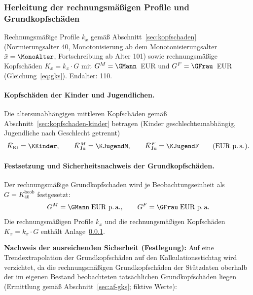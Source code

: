 
\clearpage


\subsubsection{Herleitung der rechnungsmäßigen Profile und Grundkopfschäden}\label{sec:anlage233}

Rechnungsmäßige Profile $k_x$ gemäß Abschnitt~\ref{sec:kopfschaden}
(Normierungsalter 40, Monotonisierung ab dem Monotonisierungsalter
$\tilde{x} = \MonoAlter$, Fortschreibung ab Alter 101) sowie
rechnungsmäßige Kopfschäden $K_x = k_x\cdot G$ mit
$G^{M} = \GMann$~EUR und $G^{F} = \GFrau$~EUR
(Gleichung~\eqref{eq:gks}). Endalter: 110.

\paragraph{Kopfschäden der Kinder und Jugendlichen.}
Die altersunabhängigen mittleren Kopfschäden gemäß
Abschnitt~\ref{sec:kopfschaden-kinder} betragen (Kinder
geschlechtsunabhängig, Jugendliche nach Geschlecht getrennt)
\begin{equation}
\bar{K}_{\mathrm{Ki}} = \KKinder, \qquad
\bar{K}^{M}_{\mathrm{Ju}} = \KJugendM, \qquad
\bar{K}^{F}_{\mathrm{Ju}} = \KJugendF
\qquad\text{(EUR p.\,a.)}.
\label{eq:kkinder}
\end{equation}

\paragraph{Festsetzung und Sicherheitsnachweis der Grundkopfschäden.}
Der rechnungsmäßige Grundkopfschaden wird je Beobachtungseinheit als
$G = K^{\mathrm{beob}}_{40}$ festgesetzt:
\begin{equation}
G^{M} = \GMann\;\text{EUR p.\,a.},
\qquad
G^{F} = \GFrau\;\text{EUR p.\,a.}
\label{eq:gks}
\end{equation}
Die rechnungsmäßigen Profile $k_x$ und die rechnungsmäßigen
Kopfschäden $K_x = k_x\cdot G$ enthält Anlage~\ref{sec:anlage233}.

\textbf{Nachweis der ausreichenden Sicherheit (Festlegung):} Auf eine
Trendextrapolation der Grundkopfschäden auf den Kalkulationsstichtag
wird verzichtet, da die rechnungsmäßigen Grundkopfschäden der
Stützdaten oberhalb der im eigenen Bestand beobachteten tatsächlichen
Grundkopfschäden liegen (Ermittlung gemäß
Abschnitt~\ref{sec:af-gks}; fiktive Werte):

